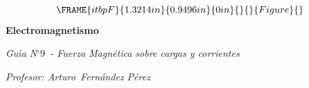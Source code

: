 \documentclass[12pt]{article}
\begin{document}
\begin{center}
\begin{equation*}
\FRAME{itbpF}{1.3214in}{0.9496in}{0in}{}{}{Figure}{\special{language
"Scientific Word";type "GRAPHIC";maintain-aspect-ratio TRUE;display
"USEDEF";valid_file "T";width 1.3214in;height 0.9496in;depth
0in;original-width 1.3552in;original-height 0.9669in;cropleft "0";croptop
"1";cropright "1";cropbottom "0";tempfilename
'R2D0SD00.bmp';tempfile-properties "XPR";}}
\end{equation*}%
\textbf{Electromagnetismo}

\emph{Gu\'{\i}a N}$%
{{}^\circ}%
9$\emph{\ - Fuerza Magn\'{e}tica sobre cargas y corrientes}

\textit{Profesor: Arturo\ Fern\'{a}ndez P\'{e}rez}
\end{center}
\end{document}
